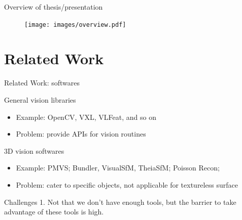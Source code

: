 \documentclass[10pt]{beamer}
\begin{document}



\begin{frame}{Overview of thesis/presentation}

\begin{figure}
\centering
\texttt{[image: images/overview.pdf]}
\end{figure}

\end{frame}

\section{Related Work}
\begin{frame}{Related Work: softwares}


\begin{exampleblock}{General vision libraries}
\begin{itemize}
  \item Example: OpenCV, VXL, VLFeat, and so on
  \item Problem: provide APIs for vision routines
\end{itemize}
\end{exampleblock}

\begin{exampleblock}{3D vision softwares}
  \begin{itemize}
    \item Example: PMVS; Bundler, VisualSfM, TheiaSfM; Poisson Recon;
    \item Problem: cater to specific objects, not applicable for textureless surface
  \end{itemize}
\end{exampleblock}

\begin{alertblock}{Challenges}
1. Not that we don't have enough tools, but the barrier to take advantage of these tools is high. \\
\end{alertblock}

\end{frame}
\end{document}
